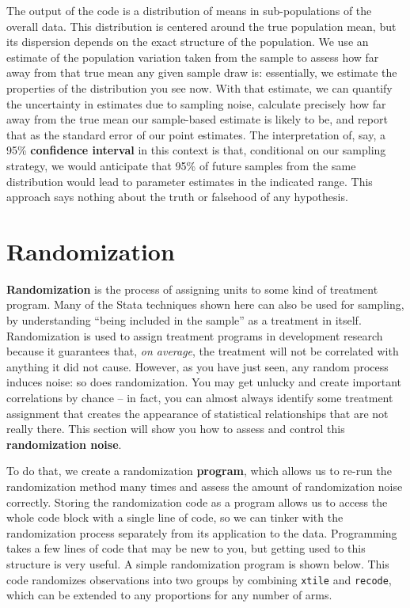 
The output of the code is a distribution of means in sub-populations of the overall data.
This distribution is centered around the true population mean,
but its dispersion depends on the exact structure of the population.
We use an estimate of the population variation taken from the sample
to assess how far away from that true mean any given sample draw is:
essentially, we estimate the properties of the distribution you see now.
With that estimate, we can quantify the uncertainty in estimates due to sampling noise,
calculate precisely how far away from the true mean
our sample-based estimate is likely to be,
and report that as the standard error of our point estimates.
The interpretation of, say, a 95\% \textbf{confidence interval}
in this context is that, conditional on our sampling strategy,
we would anticipate that 95\% of future samples from the same distribution
would lead to parameter estimates in the indicated range.
This approach says nothing about the truth or falsehood of any hypothesis.

\section{Randomization}

\textbf{Randomization} is the process of assigning units to some kind of treatment program.
Many of the Stata techniques shown here can also be used for sampling,
by understanding ``being included in the sample'' as a treatment in itself.
Randomization is used to assign treatment programs in development research
because it guarantees that, \textit{on average},
the treatment will not be correlated with anything it did not cause.\cite{duflo2007using}
However, as you have just seen,
any random process induces noise: so does randomization.
You may get unlucky and create important correlations by chance --
in fact, you can almost always identify some treatment assignment that
creates the appearance of statistical relationships that are not really there.
This section will show you how to assess and control this \textbf{randomization noise}.

To do that, we create a randomization \textbf{program}, which
allows us to re-run the randomization method many times
and assess the amount of randomization noise correctly.
Storing the randomization code as a program allows us to access the whole code block
with a single line of code, so we can tinker with the randomization process
separately from its application to the data.
Programming takes a few lines of code that may be new to you,
but getting used to this structure is very useful.
A simple randomization program is shown below.
This code randomizes observations into two groups by combining
\texttt{xtile} and \texttt{recode},
which can be extended to any proportions for any number of arms.

